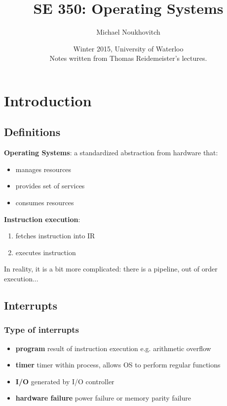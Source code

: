 \documentclass[]{article}
\theoremstyle{definition}
\begin{document}
	\let\ref\Cref

	\title{\bf{SE 350: Operating Systems}}
	\date{Winter 2015, University of Waterloo \\ \center Notes written from Thomas Reidemeister's lectures.}
	\author{Michael Noukhovitch}

	\maketitle
	\newpage
	\tableofcontents
	\newpage

	\section{Introduction}
		\subsection{Definitions}
			\textbf{Operating Systems}: a standardized abstraction from hardware that:
			\begin{itemize}
				\item manages resources
				\item provides set of services
				\item consumes resources
			\end{itemize}
			\textbf{Instruction execution}:
			\begin{enumerate}
				\item fetches instruction into IR
				\item executes instruction
			\end{enumerate}
			In reality, it is a bit more complicated: there is a pipeline, out of order execution... 
		\subsection{Interrupts}
			\subsubsection{Type of interrupts}
				\begin{itemize}
					\item \textbf{program} result of instruction execution e.g. arithmetic overflow
					\item \textbf{timer} timer within process, allows OS to perform regular functions
					\item \textbf{I/O} generated by I/O controller
					\item \textbf{hardware failure} power failure or memory parity failure
				\end{itemize}
\end{document}
